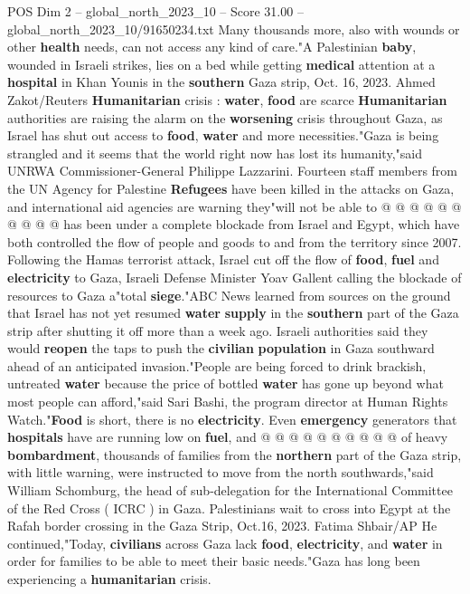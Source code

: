 \begin{textsample}{POS Dim 2 – global\_north\_2023\_10 – Score 31.00 – global\_north\_2023\_10/91650234.txt}
Many thousands more, also with wounds or other \textbf{health} needs, can not access any kind of care."A Palestinian \textbf{baby}, wounded in Israeli strikes, lies on a bed while getting \textbf{medical} attention at a \textbf{hospital} in Khan Younis in the \textbf{southern} Gaza strip, Oct. 16, 2023.
Ahmed Zakot/Reuters \textbf{Humanitarian} crisis : \textbf{water}, \textbf{food} are scarce \textbf{Humanitarian} authorities are raising the alarm on the \textbf{worsening} crisis throughout Gaza, as Israel has shut out access to \textbf{food}, \textbf{water} and more necessities."Gaza is being strangled and it seems that the world right now has lost its humanity,"said UNRWA Commissioner-General Philippe Lazzarini.
Fourteen staff members from the UN Agency for Palestine \textbf{Refugees} have been killed in the attacks on Gaza, and international aid agencies are warning they"will not be able to @ @ @ @ @ @ @ @ @ @ has been under a complete blockade from Israel and Egypt, which have both controlled the flow of people and goods to and from the territory since 2007.
Following the Hamas terrorist attack, Israel cut off the flow of \textbf{food}, \textbf{fuel} and \textbf{electricity} to Gaza, Israeli Defense Minister Yoav Gallent calling the blockade of resources to Gaza a"total \textbf{siege}."ABC News learned from sources on the ground that Israel has not yet resumed \textbf{water} \textbf{supply} in the \textbf{southern} part of the Gaza strip after shutting it off more than a week ago.
Israeli authorities said they would \textbf{reopen} the taps to push the \textbf{civilian} \textbf{population} in Gaza southward ahead of an anticipated invasion."People are being forced to drink brackish, untreated \textbf{water} because the price of bottled \textbf{water} has gone up beyond what most people can afford,"said Sari Bashi, the program director at Human Rights Watch."\textbf{Food} is short, there is no \textbf{electricity}.
Even \textbf{emergency} generators that \textbf{hospitals} have are running low on \textbf{fuel}, and @ @ @ @ @ @ @ @ @ @ of heavy \textbf{bombardment}, thousands of families from the \textbf{northern} part of the Gaza strip, with little warning, were instructed to move from the north southwards,"said William Schomburg, the head of sub-delegation for the International Committee of the Red Cross ( ICRC ) in Gaza.
Palestinians wait to cross into Egypt at the Rafah border crossing in the Gaza Strip, Oct.16, 2023.
Fatima Shbair/AP He continued,"Today, \textbf{civilians} across Gaza lack \textbf{food}, \textbf{electricity}, and \textbf{water} in order for families to be able to meet their basic needs."Gaza has long been experiencing a \textbf{humanitarian} crisis.

\end{textsample}
